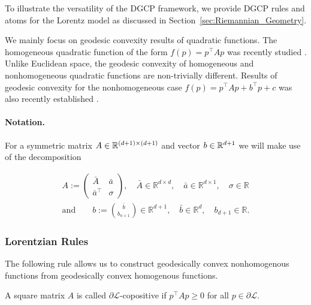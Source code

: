 \documentclass[twoside,11pt]{article}
\begin{document}
To illustrate the versatility of the DGCP framework, we provide DGCP rules and atoms for the Lorentz model as discussed in Section~\ref{sec:Riemannian_Geometry}. 

We mainly focus on geodesic convexity results of quadratic functions. The homogeneous quadratic function of the form $f(p) = p^\top A p$ was recently studied \citep{Ferreira2022}. Unlike Euclidean space, the geodesic convexity of homogeneous and nonhomogeneous quadratic functions are non-trivially different. Results of geodesic convexity for the nonhomogeneous case $f(p) = p^\top A p + b^\top p + c$ was also recently established \citep{Ferreira2023_nonhomogeneous}.

\paragraph{Notation.} For a symmetric matrix $A \in \mathbb{R}^{(d+1) \times (d+1)}$ and vector $b \in \mathbb{R}^{d+1}$ we will make use of the decomposition 

\[
\begin{gathered}
     A:=\left(\begin{array}{cc}
\bar{A} & \bar{a} \\
\bar{a}^{\top} & \sigma
\end{array}\right), \quad \bar{A} \in \mathbb{R}^{d \times d}, \quad \bar{a} \in \mathbb{R}^{d \times 1}, \quad \sigma \in \mathbb{R} \\
\text{and} \qquad b:=\binom{\bar{b}}{b_{n+1}} \in \mathbb{R}^{d+1}, \quad \bar{b} \in \mathbb{R}^d, \quad b_{d+1} \in \mathbb{R}.
\end{gathered}
\]



\subsubsection{Lorentzian Rules}

The following rule allows us to construct geodesically convex nonhomogenous functions from geodesically convex homogenous functions. 

A square matrix $A$ is called $\partial \mathcal{L}$-copositive if $p^\top A p \geq 0$ for all $p \in \partial \mathcal{L}.$
\end{document}
